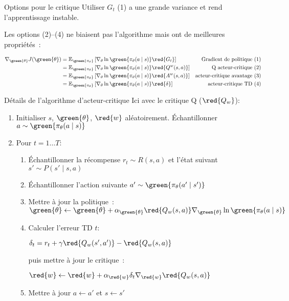 \begin{frame}{Options pour le critique}
  Utiliser $G_t$ (1) a une grande variance et rend l'apprentissage instable.

  Les options (2)--(4) ne biaisent pas l'algorithme mais ont de meilleures propriétés~:

  \begin{align*}
    \nabla_{\green{\theta}} J(\green{\theta}) & = \mathbb{E}_{\green{\pi_\theta}} \left[\nabla_\theta \ln \green{\pi_\theta(a \mid s)}\red{G_t}\right] & \text{Gradient de politique (1)} \\
    & = \mathbb{E}_{\green{\pi_\theta}} \left[\nabla_\theta \ln \green{\pi_\theta(a \mid s)}\red{Q^w(s, a)}\right] & \text{Q acteur-critique (2)} \\
    & = \mathbb{E}_{\green{\pi_\theta}} \left[\nabla_\theta \ln \green{\pi_\theta(a \mid s)}\red{A^w(s, a)}\right] & \text{acteur-critique avantage (3)} \\
    & = \mathbb{E}_{\green{\pi_\theta}} \left[\nabla_\theta \ln \green{\pi_\theta(a \mid s)}\red{\delta}\right] & \text{acteur-critique TD (4)} \\
  \end{align*}
\end{frame}

\begin{frame}{Détails de l'algorithme d'acteur-critique}
  Ici avec le critique Q ($\red{Q_w}$):

  \begin{enumerate}[<+->]
    \item Initialiser $s$, $\green{\theta}$, $\red{w}$ aléatoirement. Échantillonner $a \sim \green{\pi_\theta(a \mid s)}$
    \item Pour $t=1\dots T$:
      \begin{enumerate}
        \item Échantillonner la récompense $r_t \sim R(s, a)$ et l'état suivant $s' \sim P(s' \mid s, a)$
        \item Échantillonner l'action suivante $a' \sim \green{\pi_\theta(a' \mid s')}$
        \item Mettre à jour la politique~: $\green{\theta} \leftarrow \green{\theta} + \alpha_{\green{\theta}} \red{Q_w(s, a)}\nabla_{\green{\theta}} \ln \green{\pi_\theta(a \mid s)}$
        \item Calculer l'erreur TD $t$:

          $\delta_t = r_t + \gamma \red{Q_w(s', a')} - \red{Q_w(s, a)}$

          puis mettre à jour le critique~:

          $\red{w} \leftarrow \red{w} + \alpha_{\red{w}} \delta_t\nabla_{\red{w}}\red{Q_w(s, a)}$
        \item Mettre à jour $a \leftarrow a'$ et $s \leftarrow s'$
      \end{enumerate}
  \end{enumerate}
\end{frame}
